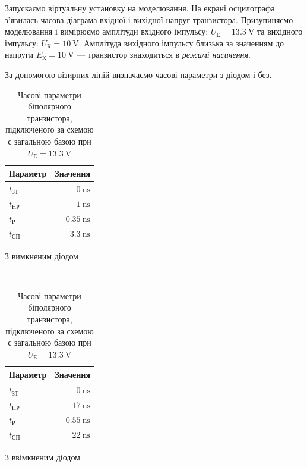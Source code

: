 \documentclass[a4paper,oneside,DIV=10,12pt]{scrartcl}
\begin{document}
		Запускаємо віртуальну установку на моделювання. На екрані осцилографа з'я\-ви\-лась часова діаграма вхідної і вихідної напруг транзистора. Призупиняємо моделювання і вимірюємо амплітуди вхідного імпульсу: $U_{\text{Е}} = \SI{13,3}{\volt}$ та вихідного імпульсу: $U_{\text{К}} = \SI{10}{\volt}$. Амплітуда вихідного імпульсу близька за значенням до напруги $E_{\text{К}} = \SI{10}{\volt}$ --- транзистор знаходиться в \emph{режимі насичення}.
		
		За допомогою візирних ліній визначаємо часові параметри з діодом і без.
		
		
		\begin{table}[H]
		\centering
			\begin{subtable}[h]{0.4\textwidth}
			\centering
				\begin{tabular}{lr}
				\toprule
				Параметр & Значення\\
				\midrule
				$t_{\text{ЗТ}}$ & $\SI{0}{\nano\second}$\\
				$t_{\text{НР}}$ & $\SI{1}{\nano\second}$\\
				$t_{\text{Р}}$ & $\SI{0,35}{\nano\second}$\\
				$t_{\text{СП}}$ & $\SI{3,3}{\nano\second}$\\
				\bottomrule
				\end{tabular}
				\caption{З вимкненим діодом}
			\end{subtable}
			~
			\begin{subtable}[h]{0.4\textwidth}
			\centering
				\begin{tabular}{lr}
				\toprule
				Параметр & Значення\\
				\midrule
				$t_{\text{ЗТ}}$ & $\SI{0}{\nano\second}$\\
				$t_{\text{НР}}$ & $\SI{17}{\nano\second}$\\
				$t_{\text{Р}}$ & $\SI{0,55}{\nano\second}$\\
				$t_{\text{СП}}$ & $\SI{22}{\nano\second}$\\
				\bottomrule
				\end{tabular}
				\caption{З ввімкненим діодом}
			\end{subtable}
		\caption{Часові параметри біполярного транзистора, підключеного за схемою с загальною базою при $U_{\text{Е}} = \SI{13,3}{\volt}$}
		\end{table}
		
\end{document}
